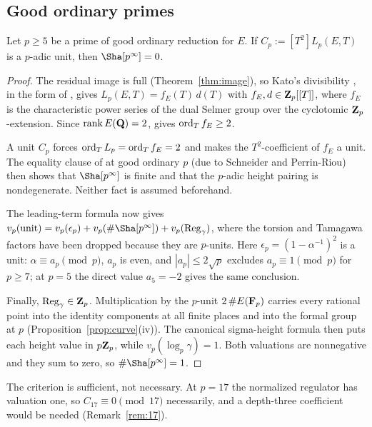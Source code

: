 \subsection{Good ordinary primes}
\begin{lemma}\label{lem:goodord}
Let $p\ge5$ be a prime of good ordinary reduction for $E$. If $C_p:=[T^2]L_p(E,T)$ is a $p$-adic unit, then $\Sha[p^\infty]=0$.
\end{lemma}
\begin{proof}
The residual image is full (Theorem~\ref{thm:image}), so Kato's divisibility \cite{kato}, in the form of \cite[Thm.~7.3]{sw}, gives $L_p(E,T)=f_E(T)\,d(T)$ with $f_E,d\in\mathbf{Z}_p[[T]]$, where $f_E$ is the characteristic power series of the dual Selmer group over the cyclotomic $\mathbf{Z}_p$-extension. Since $\operatorname{rank} E(\mathbf{Q})=2$, \cite[Thm.~6.1]{sw} gives $\operatorname{ord}_Tf_E\ge2$.

A unit $C_p$ forces $\operatorname{ord}_TL_p=\operatorname{ord}_Tf_E=2$ and makes the $T^2$-coefficient of $f_E$ a unit. The equality clause of \cite[Thm.~6.1]{sw} at good ordinary $p$ (due to Schneider and Perrin-Riou) then shows that $\Sha[p^\infty]$ is finite and that the $p$-adic height pairing is nondegenerate. Neither fact is assumed beforehand.

The leading-term formula now gives $v_p(\text{unit})=v_p(\epsilon_p)+v_p(\#\Sha[p^\infty])+v_p(\Reg_\gamma)$, where the torsion and Tamagawa factors have been dropped because they are $p$-units. Here $\epsilon_p=(1-\alpha^{-1})^2$ is a unit: $\alpha\equiv a_p\pmod p$, $a_p$ is even, and $|a_p|\le2\sqrt p$ excludes $a_p\equiv1\pmod p$ for $p\ge7$; at $p=5$ the direct value $a_5=-2$ gives the same conclusion.

Finally, $\operatorname{Reg}_\gamma\in\mathbf{Z}_p$. Multiplication by the $p$-unit $2\,\#E(\mathbf{F}_p)$ carries every rational point into the identity components at all finite places and into the formal group at $p$ (Proposition~\ref{prop:curve}(iv)). The canonical sigma-height formula \cite[\S4.1]{sw} then puts each height value in $p\mathbf{Z}_p$, while $v_p(\log_p\gamma)=1$. Both valuations are nonnegative and they sum to zero, so $\#\Sha[p^\infty]=1$.
\end{proof}
The criterion is sufficient, not necessary. At $p=17$ the normalized regulator has valuation one, so $C_{17}\equiv0\pmod{17}$ necessarily, and a depth-three coefficient would be needed (Remark~\ref{rem:17}).

